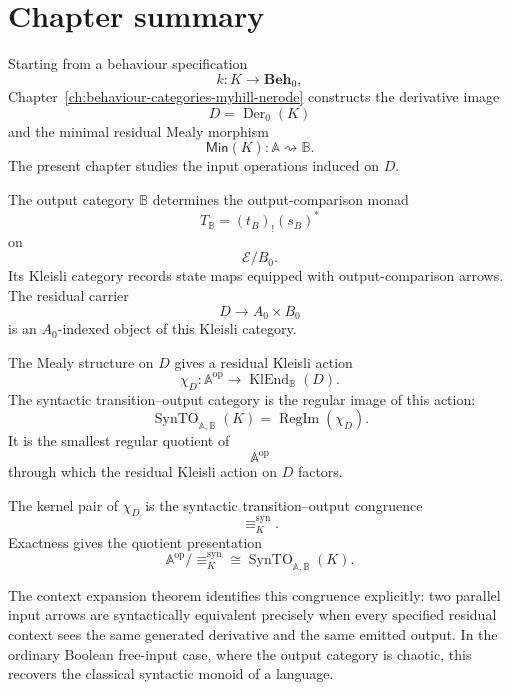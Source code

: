 \section{Chapter summary}
\label{sec:syn-to-summary}

Starting from a behaviour specification
\[
    k:K\to\mathbf{Beh}_0,
\]
Chapter~\ref{ch:behaviour-categories-myhill-nerode} constructs the derivative
image
\[
    D=\operatorname{Der}_0(K)
\]
and the minimal residual Mealy morphism
\[
    \mathsf{Min}(K):\mathbb A\rightsquigarrow\mathbb B.
\]
The present chapter studies the input operations induced on \(D\).

The output category \(\mathbb B\) determines the output-comparison monad
\[
    T_{\mathbb B}=(t_B)_!(s_B)^*
\]
on
\[
    \mathcal E/B_0.
\]
Its Kleisli category records state maps equipped with output-comparison arrows.
The residual carrier
\[
    D\to A_0\times B_0
\]
is an \(A_0\)-indexed object of this Kleisli category.

The Mealy structure on \(D\) gives a residual Kleisli action
\[
    \chi_D:
    \mathbb A^{\mathrm{op}}
    \longrightarrow
    \operatorname{KlEnd}_{\mathbb B}(D).
\]
The syntactic transition--output category is the regular image of this action:
\[
    \operatorname{SynTO}_{\mathbb A,\mathbb B}(K)
    =
    \operatorname{RegIm}(\chi_D).
\]
It is the smallest regular quotient of
\[
    \mathbb A^{\mathrm{op}}
\]
through which the residual Kleisli action on \(D\) factors.

The kernel pair of \(\chi_D\) is the syntactic transition--output congruence
\[
    {\equiv_K^{\mathrm{syn}}}.
\]
Exactness gives the quotient presentation
\[
    \mathbb A^{\mathrm{op}}/{\equiv_K^{\mathrm{syn}}}
    \cong
    \operatorname{SynTO}_{\mathbb A,\mathbb B}(K).
\]

The context expansion theorem identifies this congruence explicitly: two
parallel input arrows are syntactically equivalent precisely when every
specified residual context sees the same generated derivative and the same
emitted output. In the ordinary Boolean free-input case, where the output
category is chaotic, this recovers the classical syntactic monoid of a
language.

